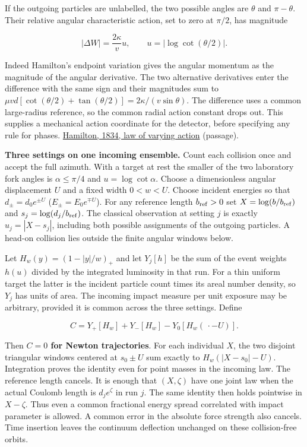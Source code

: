 \documentclass[11pt,a4paper]{article}
\begin{document}
If the outgoing particles are unlabelled, the two possible angles are
\(\theta\) and \(\pi-\theta\). Their relative angular characteristic
action, set to zero at \(\pi/2\), has magnitude

\[
 |\Delta W|=\frac{2\kappa}{v}u,\qquad u=|\log\cot(\theta/2)|.
\]

Indeed Hamilton's endpoint variation gives the angular momentum as the
magnitude of the angular derivative. The two alternative derivatives
enter the difference with the same sign and their magnitudes sum to
\(\mu v d[\cot(\theta/2)+\tan(\theta/2)]=2\kappa/(v\sin\theta)\). The
difference uses a common large-radius reference, so the common radial
action constant drops out. This supplies a mechanical action coordinate
for the detector, before specifying any rule for phases.
\href{../docs/classics/Hamilton_GeneralMethodDynamics_1834_Wilkins.md}{Hamilton,
1834, law of varying action} (passage).

\textbf{Three settings on one incoming ensemble.} Count each collision
once and accept the full azimuth. With a target at rest the smaller of
the two laboratory fork angles is \(\alpha\le\pi/4\) and
\(u=\log\cot\alpha\). Choose a dimensionless angular displacement \(U\)
and a fixed width \(0<w<U\). Choose incident energies so that
\(d_\pm=d_0 e^{\pm U}\) (\(E_\pm=E_0e^{\mp U}\)). For any reference
length \(b_{\rm ref}>0\) set \(X=\log(b/b_{\rm ref})\) and
\(s_j=\log(d_j/b_{\rm ref})\). The classical observation at setting
\(j\) is exactly \(u_j=|X-s_j|\), including both possible assignments of
the outgoing particles. A head-on collision lies outside the finite
angular windows below.

Let \(H_w(y)=(1-|y|/w)_+\) and let \(Y_j[h]\) be the sum of the event
weights \(h(u)\) divided by the integrated luminosity in that run. For a
thin uniform target the latter is the incident particle count times its
areal number density, so \(Y_j\) has units of area. The incoming impact
measure per unit exposure may be arbitrary, provided it is common across
the three settings. Define

\[
 C=Y_+[H_w]+Y_-[H_w]-Y_0[H_w(\,\cdot-U)] .
\]

Then \textbf{\(C=0\) for Newton trajectories}. For each individual
\(X\), the two disjoint triangular windows centered at \(s_0\pm U\) sum
exactly to \(H_w(|X-s_0|-U)\). Integration proves the identity even for
point masses in the incoming law. The reference length cancels. It is
enough that \((X,\zeta)\) have one joint law when the actual Coulomb
length is \(d_je^\zeta\) in run \(j\). The same identity then holds
pointwise in \(X-\zeta\). Thus even a common fractional energy spread
correlated with impact parameter is allowed. A common error in the
absolute force strength also cancels. Time insertion leaves the
continuum deflection unchanged on these collision-free orbits.
\end{document}
